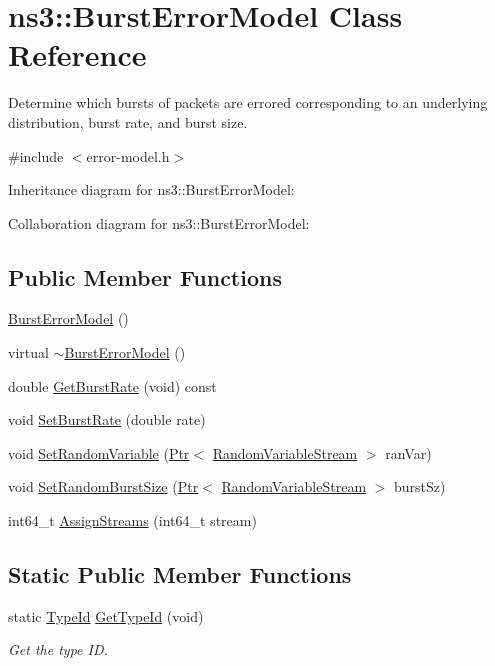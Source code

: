 \hypertarget{classns3_1_1BurstErrorModel}{}\section{ns3\+:\+:Burst\+Error\+Model Class Reference}
\label{classns3_1_1BurstErrorModel}


Determine which bursts of packets are errored corresponding to an underlying distribution, burst rate, and burst size.  




{\ttfamily \#include $<$error-\/model.\+h$>$}



Inheritance diagram for ns3\+:\+:Burst\+Error\+Model\+:


Collaboration diagram for ns3\+:\+:Burst\+Error\+Model\+:
\subsection*{Public Member Functions}
\begin{DoxyCompactItemize}
\item 
\hyperlink{classns3_1_1BurstErrorModel_a37ba662e1bd169a66eab024845ba5fe5}{Burst\+Error\+Model} ()
\item 
virtual \hyperlink{classns3_1_1BurstErrorModel_a8f4eab888501296a9f52e09ae0e6f252}{$\sim$\+Burst\+Error\+Model} ()
\item 
double \hyperlink{classns3_1_1BurstErrorModel_ae6915974b68d948b99813522e99a1926}{Get\+Burst\+Rate} (void) const 
\item 
void \hyperlink{classns3_1_1BurstErrorModel_aac099fc5cafc9d837f31647609ed6e7f}{Set\+Burst\+Rate} (double rate)
\item 
void \hyperlink{classns3_1_1BurstErrorModel_a12c57e987f27335fad1c023607778795}{Set\+Random\+Variable} (\hyperlink{classns3_1_1Ptr}{Ptr}$<$ \hyperlink{classns3_1_1RandomVariableStream}{Random\+Variable\+Stream} $>$ ran\+Var)
\item 
void \hyperlink{classns3_1_1BurstErrorModel_aedc9f16a9c02a825eae385ee75cbedda}{Set\+Random\+Burst\+Size} (\hyperlink{classns3_1_1Ptr}{Ptr}$<$ \hyperlink{classns3_1_1RandomVariableStream}{Random\+Variable\+Stream} $>$ burst\+Sz)
\item 
int64\+\_\+t \hyperlink{classns3_1_1BurstErrorModel_ae054a2275b29a6b0405bb63756b4e6b9}{Assign\+Streams} (int64\+\_\+t stream)
\end{DoxyCompactItemize}
\subsection*{Static Public Member Functions}
\begin{DoxyCompactItemize}
\item 
static \hyperlink{classns3_1_1TypeId}{Type\+Id} \hyperlink{classns3_1_1BurstErrorModel_a60d6119e4752c13c4d990cb2bac00cef}{Get\+Type\+Id} (void)
\begin{DoxyCompactList}\small\item\em Get the type ID. \end{DoxyCompactList}\end{DoxyCompactItemize}
